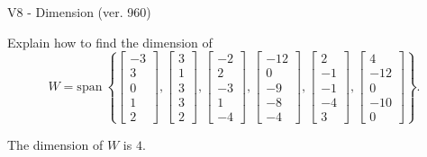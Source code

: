 \begin{exercise}
  \begin{exerciseTitle}V8 - Dimension (ver. 960)\end{exerciseTitle}
  \begin{exerciseStatement}
    Explain how to find the dimension of 
\[W=\mathrm{span}\ \left\{\left[\begin{array}{r}
-3 \\
3 \\
0 \\
1 \\
2
\end{array}\right] , \left[\begin{array}{r}
3 \\
1 \\
3 \\
3 \\
2
\end{array}\right] , \left[\begin{array}{r}
-2 \\
2 \\
-3 \\
1 \\
-4
\end{array}\right] , \left[\begin{array}{r}
-12 \\
0 \\
-9 \\
-8 \\
-4
\end{array}\right] , \left[\begin{array}{r}
2 \\
-1 \\
-1 \\
-4 \\
3
\end{array}\right] , \left[\begin{array}{r}
4 \\
-12 \\
0 \\
-10 \\
0
\end{array}\right]\right\}.\]



  \end{exerciseStatement}
  \begin{exerciseAnswer}
   The dimension of \(W\) is  \(4\).
  


  \end{exerciseAnswer}
\end{exercise}